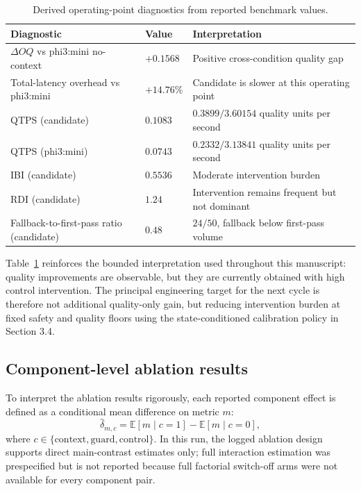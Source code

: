 ﻿\documentclass[a4paper,12pt]{article}
\begin{document}
\begin{table}[t]
\centering
\caption{Derived operating-point diagnostics from reported benchmark values.}
\label{tab:operating_point_diagnostics}
\begingroup
\footnotesize
\setlength{\tabcolsep}{4pt}
\begin{tabular}{p{}p{}p{}}
\toprule
Diagnostic & Value & Interpretation \\
\midrule
\(\Delta OQ\) vs phi3:mini no-context & \(+0.1568\) & Positive cross-condition quality gap \\
Total-latency overhead vs phi3:mini & \(+14.76\%\) & Candidate is slower at this operating point \\
QTPS (candidate) & \(0.1083\) & \(0.3899/3.60154\) quality units per second \\
QTPS (phi3:mini) & \(0.0743\) & \(0.2332/3.13841\) quality units per second \\
IBI (candidate) & \(0.5536\) & Moderate intervention burden \\
RDI (candidate) & \(1.24\) & Intervention remains frequent but not dominant \\
Fallback-to-first-pass ratio (candidate) & \(0.48\) & \(24/50\), fallback below first-pass volume \\
\bottomrule
\end{tabular}
\endgroup
\end{table}

Table~\ref{tab:operating_point_diagnostics} reinforces the bounded interpretation used throughout this manuscript: quality improvements are observable, but they are currently obtained with high control intervention. The principal engineering target for the next cycle is therefore not additional quality-only gain, but reducing intervention burden at fixed safety and quality floors using the state-conditioned calibration policy in Section 3.4.

\subsection{Component-level ablation results}

To interpret the ablation results rigorously, each reported component effect is defined as a conditional mean difference on metric \(m\):
\begin{equation}
\hat{\delta}_{m,c}=\mathbb{E}[m\mid c=1]-\mathbb{E}[m\mid c=0],
\end{equation}
where \(c\in\{\text{context},\text{guard},\text{control}\}\). In this run, the logged ablation design supports direct main-contrast estimates only; full interaction estimation was prespecified but is not reported because full factorial switch-off arms were not available for every component pair.
\end{document}
